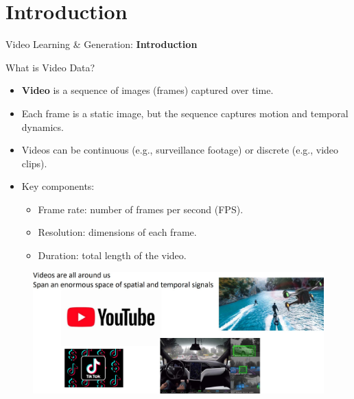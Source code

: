 \section{Introduction}
\begin{frame}{}
    \LARGE Video Learning \& Generation: \textbf{Introduction}
\end{frame}

\begin{frame}[allowframebreaks]{What is Video Data?}
    \begin{itemize}
        \item \textbf{Video} is a sequence of images (frames) captured over time.
        \item Each frame is a static image, but the sequence captures motion and temporal dynamics.
        \item Videos can be continuous (e.g., surveillance footage) or discrete (e.g., video clips).
        \item Key components:
        \begin{itemize}
            \item Frame rate: number of frames per second (FPS).
            \item Resolution: dimensions of each frame.
            \item Duration: total length of the video.
        \end{itemize}
    \end{itemize}
\framebreak
    \begin{figure}
        \centering
        \includegraphics[width=1\textwidth,height=0.9\textheight,keepaspectratio]{images/video/slide_2_1_img.jpg}
    \end{figure}
\framebreak
    \begin{figure}
        \centering

\end{figure}
\end{frame}
